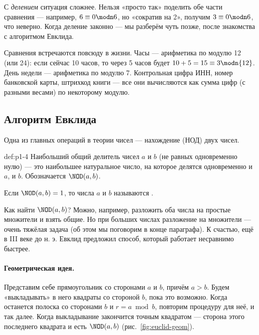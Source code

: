 С \emph{делением} ситуация сложнее. Нельзя «просто так» поделить обе части сравнения --- например, $6 \equiv 0 \modn 6$, но «сократив на 2», получим $3 \equiv 0 \modn 6$, что неверно. Когда деление законно --- мы разберём чуть позже, после знакомства с алгоритмом Евклида.

\begin{interestbox}
Сравнения встречаются повсюду в жизни. Часы --- арифметика по модулю 12 (или 24): если сейчас 10 часов, то через 5 часов будет $10 + 5 = 15 \equiv 3 \modn{12}$. День недели --- арифметика по модулю 7. Контрольная цифра ИНН, номер банковской карты, штрихкод книги --- все они вычисляются как сумма цифр (с разными весами) по некоторому модулю.
\end{interestbox}

\subsection{Алгоритм Евклида}
\label{subsec:euclid}

Одна из главных операций в теории чисел --- нахождение  (НОД) двух чисел.

\begin{definition}{}{def:p1-4}
Наибольший общий делитель чисел $a$ и $b$ (не равных одновременно нулю) --- это наибольшее натуральное число, на которое делятся одновременно и $a$, и $b$. Обозначается $\NOD(a,b)$.

Если $\NOD(a,b) = 1$, то числа $a$ и $b$ называются .
\end{definition}

Как найти $\NOD(a,b)$? Можно, например, разложить оба числа на простые множители и взять общие. Но при больших числах разложение на множители --- очень тяжёлая задача (об этом мы поговорим в конце параграфа). К счастью, ещё в III веке до н. э. Евклид предложил способ, который работает несравнимо быстрее.

\paragraph*{Геометрическая идея.} Представим себе прямоугольник со сторонами $a$ и $b$, причём $a > b$. Будем «выкладывать» в него квадраты со стороной $b$, пока это возможно. Когда останется полоска со сторонами $b$ и $r = a \bmod b$, повторим процедуру для неё, и так далее. Когда выкладывание закончится точным квадратом --- сторона этого последнего квадрата и есть $\NOD(a,b)$ (рис.~\ref{fig:euclid-geom}).

